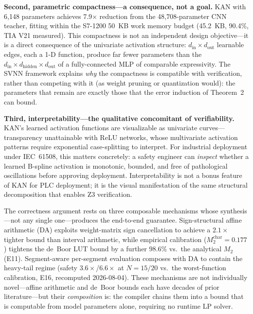 \documentclass[journal,onecolumn]{IEEEtran}
\begin{document}
\textbf{Second, parametric compactness---a consequence, not a goal.}
KAN with 6,148 parameters achieves 7.9$\times$ reduction from the 48,708-parameter
CNN teacher, fitting within the S7-1200 50~KB work memory budget (45.2~KB,
90.4\%, TIA V21 measured). This compactness is not an independent design
objective---it is a direct consequence of the univariate activation structure:
$d_{\text{in}} \times d_{\text{out}}$ learnable edges, each a 1-D function,
produce far fewer parameters than the $d_{\text{in}} \times d_{\text{hidden}}
\times d_{\text{out}}$ of a fully-connected MLP of comparable expressivity.
The SVNN framework explains \textit{why} the compactness is compatible with
verification, rather than competing with it (as weight pruning or quantization
would): the parameters that remain are exactly those that the error induction
of Theorem~2 can bound.

\textbf{Third, interpretability---the qualitative concomitant of verifiability.}
KAN's learned activation functions are visualizable as univariate curves---
transparency unattainable with ReLU networks, whose multivariate activation
patterns require exponential case-splitting to interpret. For industrial
deployment under IEC~61508, this matters concretely: a safety engineer can
\textit{inspect} whether a learned B-spline activation is monotonic, bounded,
and free of pathological oscillations before approving deployment.
Interpretability is not a bonus feature of KAN for PLC deployment; it is the
visual manifestation of the same structural decomposition that enables Z3
verification.

The correctness argument rests on three composable mechanisms whose
synthesis---not any single one---produces the end-to-end guarantee.
Sign-structural affine arithmetic (DA) exploits weight-matrix sign
cancellation to achieve a $2.1\times$ tighter bound than interval arithmetic,
while empirical calibration ($M_2^{\text{char}} = 0.177$) tightens the de~Boor
LUT bound by a further $98.6\%$ vs.\ the analytical $M_2$ (E11).
Segment-aware per-segment evaluation composes with DA to contain the
heavy-tail regime (safety $3.6\times$/$6.6\times$ at $N{=}15/20$ vs.\ the
worst-function calibration, E16, recomputed 2026-08-04).
These mechanisms are not individually novel---affine arithmetic and de~Boor
bounds each have decades of prior literature---but their \textit{composition}
is: the compiler chains them into a bound that is computable from model
parameters alone, requiring no runtime LP solver.
\end{document}
